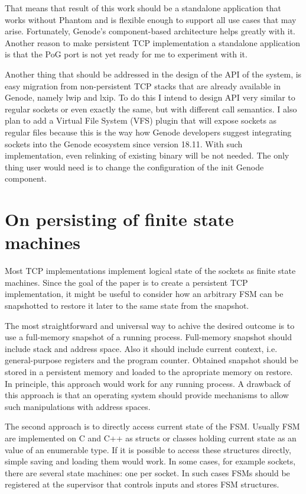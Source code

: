 That means that result of this work should be a standalone application that
works without Phantom and is flexible enough to support all use cases that may
arise. Fortunately, Genode's component-based architecture helps greatly with
it. Another reason to make persistent TCP implementation a standalone
application is that the PoG port is not yet ready for me to experiment with it.

Another thing that should be addressed in the design of the API of the system,
is easy migration from non-persistent TCP stacks that are already available in
Genode, namely lwip and lxip. To do this I intend to design API very similar to
regular sockets or even exactly the same, but with different call semantics. I
also plan to add a Virtual File System (VFS) plugin that will expose sockets as
regular files because this is the way how Genode developers suggest
integrating sockets into the Genode ecosystem since version 18.11. With such
implementation, even relinking of existing binary will be not needed. The only
thing user would need is to change the configuration of the init Genode
component.

\section{On persisting of finite state machines}
\label{sec:meth:fsms}

Most TCP implementations implement logical state of the sockets as finite state
machines. Since the goal of the paper is to create a persistent TCP
implementation, it might be useful to consider how an arbitrary FSM can be
snapshotted to restore it later to the same state from the snapshot. 

The most straightforward and universal way to achive the desired outcome is to
use a full-memory snapshot of a running process. Full-memory snapshot should
include stack and address space. Also it should include current context, i.e.
general-purpose registers and the program counter. Obtained snapshot should be
stored in a persistent memory and loaded to the apropriate memory on restore.
In principle, this approach would work for any running process. A drawback of
this approach is that an operating system should provide mechanisms to allow
such manipulations with address spaces.

The second approach is to directly access current state of the FSM. Usually FSM
are implemented on C and C++ as structs or classes holding current state as an
value of an enumerable type. If it is possible to access these structures
directly, simple saving and loading them would work. In some cases, for example
sockets, there are several state machines: one per socket. In such cases FSMs
should be registered at the supervisor that controls inputs and stores FSM
structures.

